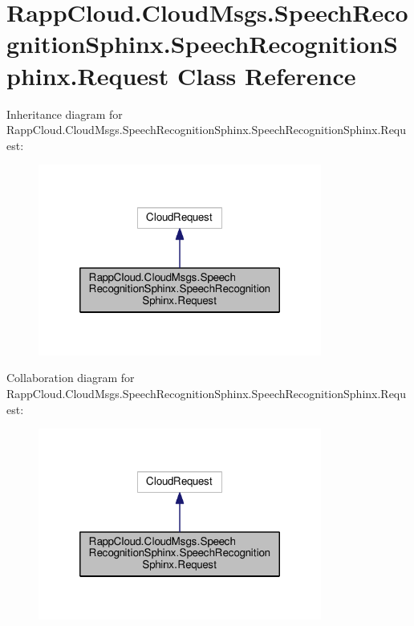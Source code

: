 \hypertarget{classRappCloud_1_1CloudMsgs_1_1SpeechRecognitionSphinx_1_1SpeechRecognitionSphinx_1_1Request}{\section{Rapp\-Cloud.\-Cloud\-Msgs.\-Speech\-Recognition\-Sphinx.\-Speech\-Recognition\-Sphinx.\-Request Class Reference}
\label{classRappCloud_1_1CloudMsgs_1_1SpeechRecognitionSphinx_1_1SpeechRecognitionSphinx_1_1Request}
}


Inheritance diagram for Rapp\-Cloud.\-Cloud\-Msgs.\-Speech\-Recognition\-Sphinx.\-Speech\-Recognition\-Sphinx.\-Request\-:
\nopagebreak
\begin{figure}[H]
\begin{center}
\leavevmode
\includegraphics[width=264pt]{classRappCloud_1_1CloudMsgs_1_1SpeechRecognitionSphinx_1_1SpeechRecognitionSphinx_1_1Request__inherit__graph}
\end{center}
\end{figure}


Collaboration diagram for Rapp\-Cloud.\-Cloud\-Msgs.\-Speech\-Recognition\-Sphinx.\-Speech\-Recognition\-Sphinx.\-Request\-:
\nopagebreak
\begin{figure}[H]
\begin{center}
\leavevmode
\includegraphics[width=264pt]{classRappCloud_1_1CloudMsgs_1_1SpeechRecognitionSphinx_1_1SpeechRecognitionSphinx_1_1Request__coll__graph}
\end{center}
\end{figure}
